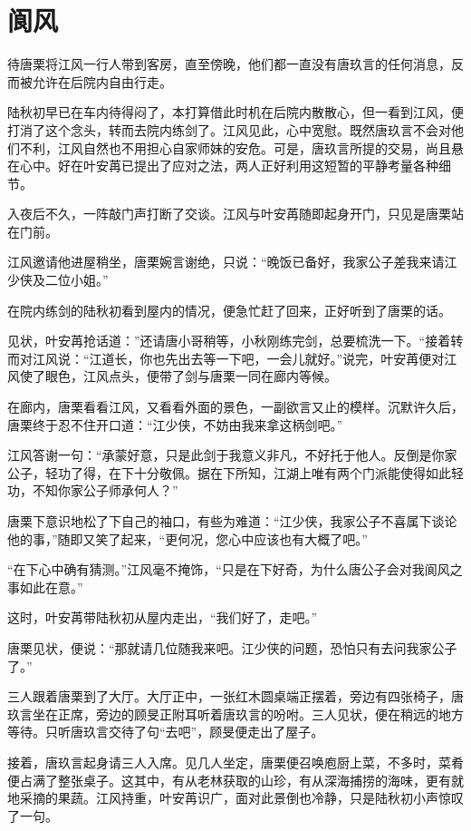 \chapter{阆风}
待唐栗将江风一行人带到客房，直至傍晚，他们都一直没有唐玖言的任何消息，反而被允许在后院内自由行走。

陆秋初早已在车内待得闷了，本打算借此时机在后院内散散心，但一看到江风，便打消了这个念头，转而去院内练剑了。江风见此，心中宽慰。既然唐玖言不会对他们不利，江风自然也不用担心自家师妹的安危。可是，唐玖言所提的交易，尚且悬在心中。好在叶安苒已提出了应对之法，两人正好利用这短暂的平静考量各种细节。

入夜后不久，一阵敲门声打断了交谈。江风与叶安苒随即起身开门，只见是唐栗站在门前。

江风邀请他进屋稍坐，唐栗婉言谢绝，只说：“晚饭已备好，我家公子差我来请江少侠及二位小姐。”

在院内练剑的陆秋初看到屋内的情况，便急忙赶了回来，正好听到了唐栗的话。

见状，叶安苒抢话道：”还请唐小哥稍等，小秋刚练完剑，总要梳洗一下。“接着转而对江风说：“江道长，你也先出去等一下吧，一会儿就好。”说完，叶安苒便对江风使了眼色，江风点头，便带了剑与唐栗一同在廊内等候。

在廊内，唐栗看看江风，又看看外面的景色，一副欲言又止的模样。沉默许久后，唐栗终于忍不住开口道：“江少侠，不妨由我来拿这柄剑吧。”

江风答谢一句：“承蒙好意，只是此剑于我意义非凡，不好托于他人。反倒是你家公子，轻功了得，在下十分敬佩。据在下所知，江湖上唯有两个门派能使得如此轻功，不知你家公子师承何人？”

唐栗下意识地松了下自己的袖口，有些为难道：“江少侠，我家公子不喜属下谈论他的事，”随即又笑了起来，“更何况，您心中应该也有大概了吧。”

“在下心中确有猜测。”江风毫不掩饰，“只是在下好奇，为什么唐公子会对我阆风之事如此在意。”

这时，叶安苒带陆秋初从屋内走出，“我们好了，走吧。”

唐栗见状，便说：“那就请几位随我来吧。江少侠的问题，恐怕只有去问我家公子了。”

三人跟着唐栗到了大厅。大厅正中，一张红木圆桌端正摆着，旁边有四张椅子，唐玖言坐在正席，旁边的顾旻正附耳听着唐玖言的吩咐。三人见状，便在稍远的地方等待。只听唐玖言交待了句“去吧”，顾旻便走出了屋子。

接着，唐玖言起身请三人入席。见几人坐定，唐栗便召唤庖厨上菜，不多时，菜肴便占满了整张桌子。这其中，有从老林获取的山珍，有从深海捕捞的海味，更有就地采摘的果蔬。江风持重，叶安苒识广，面对此景倒也冷静，只是陆秋初小声惊叹了一句。

